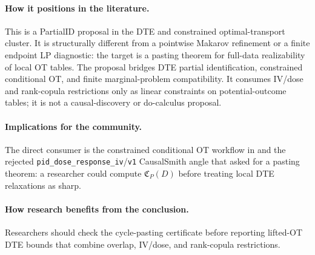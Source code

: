 \documentclass[11pt]{article}
\theoremstyle{definition}
\theoremstyle{plain}
\theoremstyle{remark}
\begin{document}
\paragraph{How it positions in the literature.}
This is a PartialID proposal in the DTE and constrained optimal-transport
cluster.  It is structurally different from a pointwise Makarov refinement or a
finite endpoint LP diagnostic: the target is a pasting theorem for full-data
realizability of local OT tables.  The proposal bridges DTE partial
identification, constrained conditional OT, and finite marginal-problem
compatibility.  It consumes IV/dose and rank-copula restrictions only as linear
constraints on potential-outcome tables; it is not a causal-discovery or
do-calculus proposal.

\paragraph{Implications for the community.}
The direct consumer is the constrained conditional OT workflow in
\citet{TanBlanchetSyrgkanis2026} and the rejected
\texttt{pid\_dose\_response\_iv}/\texttt{v1} CausalSmith angle that asked for a
pasting theorem: a researcher could compute \(\mathfrak C_P(D)\) before treating
local DTE relaxations as sharp.

\paragraph{How research benefits from the conclusion.}
Researchers should check the cycle-pasting certificate before reporting
lifted-OT DTE bounds that combine overlap, IV/dose, and rank-copula restrictions.
\end{document}
